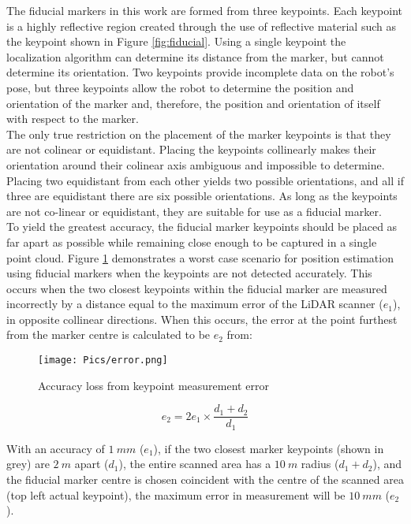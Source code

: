 The fiducial markers in this work are formed from three keypoints. Each keypoint is a highly reflective region created through the use of reflective material such as the keypoint shown in Figure \ref{fig:fiducial}. Using a single keypoint the localization algorithm can determine its distance from the marker, but cannot determine its orientation. Two keypoints provide incomplete data on the robot's pose, but three keypoints allow the robot to determine the position and orientation of the marker and, therefore, the position and orientation of itself with respect to the marker.\\

The only true restriction on the placement of the marker keypoints is that they are not colinear or equidistant. Placing the keypoints collinearly makes their orientation around their colinear axis ambiguous and impossible to determine. Placing two equidistant from each other yields two possible orientations, and all if three are equidistant there are six possible orientations. As long as the keypoints are not co-linear or equidistant, they are suitable for use as a fiducial marker.\\

To yield the greatest accuracy, the fiducial marker keypoints should be placed as far apart as possible while remaining close enough to be captured in a single point cloud. Figure \ref{fig:resacc} demonstrates a worst case scenario for position estimation using fiducial markers when the keypoints are not detected accurately. This occurs when the two closest keypoints within the fiducial marker are measured incorrectly by a distance equal to the maximum error of the LiDAR scanner ($e_1$), in opposite collinear directions. When this occurs, the error at the point furthest from the marker centre is calculated to be $e_2$ from:

\begin{figure}
\texttt{[image: Pics/error.png]}
\caption{Accuracy loss from keypoint measurement error}
\label{fig:resacc} 
\end{figure}

\begin{equation}
   e_2 = 2e_1\times\frac{d_1+d_2}{d_1}\label{eq:2}
\end{equation}

With an accuracy of $1\ mm$ ($e_1$), if the two closest marker keypoints (shown in grey) are $2\ m$ apart ($d_1$), the entire scanned area has a $10\ m$ radius ($d_1+d_2$), and the fiducial marker centre is chosen coincident with the centre of the scanned area (top left actual keypoint), the maximum error in measurement will be $10\ mm$ ($e_2$).\\

